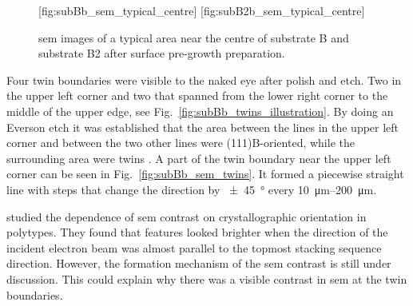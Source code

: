 \begin{figure}[htbp]
    [fig:subBb_sem_typical_centre]
    \hfill
    [fig:subB2b_sem_typical_centre]
    \caption[\Ac{sem} images of typical areas on substrate B and B2 with surface pre-growth preparation.]{\Ac{sem} images of a typical area near the centre of  substrate B and  substrate B2 after surface pre-growth preparation.}\label{fig:subBb_and_subB2b_sem_typical}
\end{figure}

Four twin boundaries were visible to the naked eye after polish and etch. Two in the upper left corner and two that spanned from the lower right corner to the middle of the upper edge, see Fig.~\ref{fig:subBb_twins_illustration}. By doing an Everson etch it was established that the area between the lines in the upper left corner and between the two other lines were (111)B-oriented, while the surrounding area were twins \citep{everson1995etch}. A part of the twin boundary near the upper left corner can be seen in Fig.~\ref{fig:subBb_sem_twins}. It formed a piecewise straight line with steps that change the direction by \SI{\pm 45}{\degree} every \SIrange{10}{200}{\micro\metre}.

\citet{ashida2015crystallographic} studied the dependence of \ac{sem} contrast on crystallographic orientation in  polytypes. They found that features looked brighter when the direction of the incident electron beam was almost parallel to the topmost stacking sequence direction. However, the formation mechanism of the \ac{sem} contrast is still under discussion. This could explain why there was a visible contrast in \ac{sem} at the twin boundaries.

